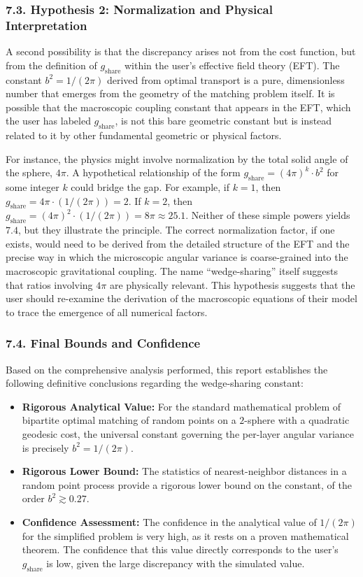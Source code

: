 \documentclass[11pt]{article}
\begin{document}
\subsubsection*{7.3. Hypothesis 2: Normalization and Physical Interpretation}
A second possibility is that the discrepancy arises not from the cost function, but from the definition of $g_{\mathrm{share}}$ within the user’s effective field theory (EFT). The constant $b^2 = 1/(2\pi)$ derived from optimal transport is a pure, dimensionless number that emerges from the geometry of the matching problem itself. It is possible that the macroscopic coupling constant that appears in the EFT, which the user has labeled $g_{\mathrm{share}}$, is not this bare geometric constant but is instead related to it by other fundamental geometric or physical factors.

For instance, the physics might involve normalization by the total solid angle of the sphere, $4\pi$. A hypothetical relationship of the form $g_{\mathrm{share}} = (4\pi)^k \cdot b^2$ for some integer $k$ could bridge the gap. For example, if $k = 1$, then $g_{\mathrm{share}} = 4\pi \cdot (1/(2\pi)) = 2$. If $k = 2$, then $g_{\mathrm{share}} = (4\pi)^2 \cdot (1/(2\pi)) = 8\pi \approx 25.1$. Neither of these simple powers yields $7.4$, but they illustrate the principle. The correct normalization factor, if one exists, would need to be derived from the detailed structure of the EFT and the precise way in which the microscopic angular variance is coarse-grained into the macroscopic gravitational coupling. The name “wedge-sharing” itself suggests that ratios involving $4\pi$ are physically relevant. This hypothesis suggests that the user should re-examine the derivation of the macroscopic equations of their model to trace the emergence of all numerical factors.

\subsubsection*{7.4. Final Bounds and Confidence}
Based on the comprehensive analysis performed, this report establishes the following definitive conclusions regarding the wedge-sharing constant:
\begin{itemize}
  \item \textbf{Rigorous Analytical Value:} For the standard mathematical problem of bipartite optimal matching of random points on a $2$-sphere with a quadratic geodesic cost, the universal constant governing the per-layer angular variance is precisely $b^2 = 1/(2\pi)$.
  \item \textbf{Rigorous Lower Bound:} The statistics of nearest-neighbor distances in a random point process provide a rigorous lower bound on the constant, of the order $b^2 \gtrsim 0.27$.
  \item \textbf{Confidence Assessment:} The confidence in the analytical value of $1/(2\pi)$ for the simplified problem is very high, as it rests on a proven mathematical theorem. The confidence that this value directly corresponds to the user’s $g_{\mathrm{share}}$ is low, given the large discrepancy with the simulated value.
\end{itemize}
\end{document}
